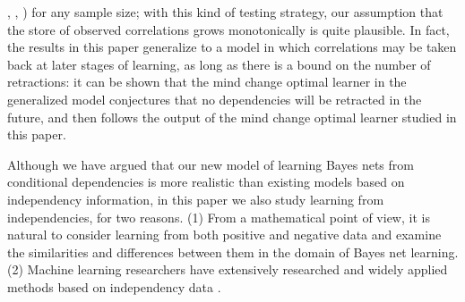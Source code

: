 \documentclass{elsarticle}%
\begin{document}
\cite[Ch.5]{peter00:_causat}, \cite{campos06:_bayes}, \cite{bib:max-min}) for any sample size; with this kind of testing strategy, our assumption that the store of observed correlations grows monotonically is quite plausible. In fact, the results in this paper generalize to a model in which correlations may be taken back at later stages of learning, as long as there is a bound on the number of retractions: it can be shown that the mind change optimal learner in the generalized model conjectures that no dependencies will be retracted in the future, and then follows the output of the mind change optimal learner studied in this paper.

Although we have argued that our new model of learning Bayes nets from conditional dependencies is more realistic than existing models based on independency information, in this paper we also study learning from independencies, for two reasons. (1) From  a mathematical point of view, it is natural to consider learning from both positive and negative data and examine the similarities and differences between them in the domain of Bayes net learning. (2) Machine learning researchers have extensively researched and widely applied methods based on independency data \cite{peter00:_causat,studeny05:_probab_condit_indep_struc,cheng02:_learn_bayes,bib:max-min}. 
\end{document}
